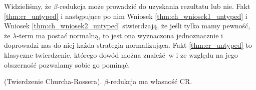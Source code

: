 Widzieliśmy, że \(\beta\)-redukcja może prowadzić do uzyskania rezultatu lub nie. Fakt \ref{thm:cr_untyped} i następujące po nim Wniosek \ref{thm:ch_wniosek1_untyped} i Wniosek \ref{thm:ch_wniosek2_untyped} stwierdzają, że jeśli tylko mamy pewność, że \(\lambda\)-term ma postać normalną, to jest ona wyznaczona jednoznacznie i doprowadzi nas do niej każda strategia normalizująca. Fakt \ref{thm:cr_untyped} to klasyczne twierdzenie, którego dowód można znaleźć w \cite{Barendregt_1992} i ze względu na jego obszerność pozwalamy sobie go pominąć. 

\begin{fakt}(Twierdzenie Churcha-Rossera)\label{thm:cr_untyped}. 
\(\beta\)-redukcja ma własność CR. 
\end{fakt}

